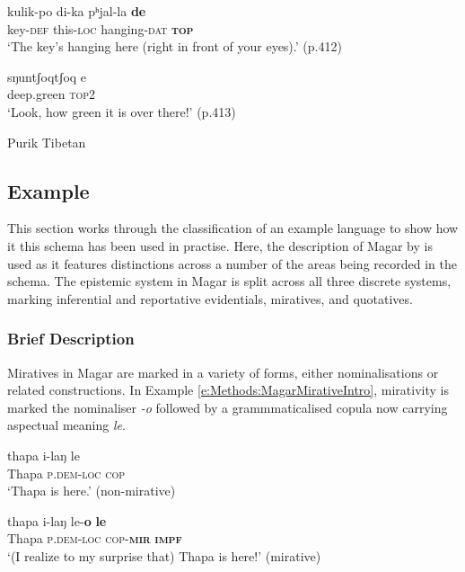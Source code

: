 \begin{exe}
  \ex \label{e:Methods:PurikDem}
  \begin{xlist}
    \ex 
    \gll kulik-po di-ka pʰjal-la \textbf{de} \\
    key-\textsc{def} this-\textsc{loc} hanging-\textsc{dat} \textsc{\textbf{top}} \\
    \glt `The key’s hanging here (right in front of your eyes).' (p.412)

    \ex
    \gll sŋuntʃoqtʃoq e \\
    deep.green \textsc{top2} \\
    \glt `Look, how green it is over there!' (p.413)
  \end{xlist}
  Purik Tibetan \cite[Tibetic:India][]{Zemp2021}
\end{exe}

\subsection{Example}\label{ss:Methods:MagarExample}
This section works through the classification of an example language to show how it this schema has been used in practise. Here, the description of Magar by  is used as it features distinctions across a number of the areas being recorded in the schema. The epistemic system in Magar is split across all three discrete systems, marking inferential and reportative evidentials, miratives, and quotatives.

\subsubsection{Brief Description}
Miratives in Magar are marked in a variety of forms, either nominalisations or related constructions. In Example \ref{e:Methods:MagarMirativeIntro}, mirativity is marked the nominaliser \textit{-o} followed by a grammmaticalised copula now carrying aspectual meaning \textit{le}. 

\begin{exe}
  \ex\label{e:Methods:MagarMirativeIntro}
  \begin{xlist}
    \ex
    \gll thapa i-laŋ le \\
    Thapa \textsc{p.dem-loc} \textsc{cop} \\
    \glt `Thapa is here.' (non-mirative)

    \ex 
    \gll thapa i-laŋ le-\textbf{o} \textbf{le} \\
    Thapa \textsc{p.dem-loc} \textsc{cop-\textbf{mir}} \textsc{\textbf{impf}} \\
    \glt `(I realize to my surprise that) Thapa is here!' (mirative)
  \end{xlist}
  \cite[Magar,][480]{GrunowHarsta2008}
\end{exe}

